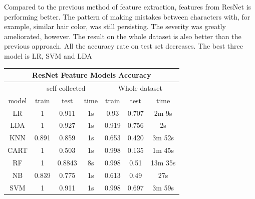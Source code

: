 \documentclass[11.5pt]{article}
\begin{document}
\begin{enumerate}
\begin{itemize}
            \vspace{3mm}
            \begin{minipage}{0.35\textwidth}
                Compared to the previous method of feature extraction, features from ResNet is performing better.
                The pattern of making mistakes between characters with, for example, similar hair color, was still persisting.
                The severity was greatly ameliorated, however.
                The result on the whole dataset is also better than the previous approach.
                All the accuracy rate on test set decreases.
                The best three model is LR, SVM and LDA
            \end{minipage}
            \begin{minipage}{0.5\textwidth}
                \begin{tabular}{|c|c|c|c|c|c|c|}
                    \multicolumn{7}{c}{\textbf{ResNet Feature Models Accuracy} }\\
                    \hline
                    & \multicolumn{3}{|c|}{self-collected} & \multicolumn{3}{|c|}{Whole dataset} \\ \hline
                    model & train & test & time & train & test & time \\ \hline
                    LR & 1 & 0.911 & 1s & 0.93 & 0.707 & 2m 9s \\ \hline
                    LDA & 1 & 0.927 & 1s & 0.919 & 0.756 & 2s \\ \hline
                    KNN & 0.891 & 0.859 & 1s & 0.653 & 0.420 & 3m 52s \\ \hline
                    CART & 1 & 0.503 & 1s & 0.998 & 0.135 & 1m 45s \\ \hline
                    RF & 1 & 0.8843 & 8s & 0.998 & 0.51 & 13m 35s\\ \hline
                    NB & 0.839 & 0.775 & 1s & 0.613 & 0.49 & 27s \\ \hline
                    SVM & 1 & 0.911 & 1s & 0.998 & 0.697 & 3m 59s \\ \hline
                \end{tabular}
            \end{minipage}



\end{itemize}
\end{enumerate}
\end{document}
